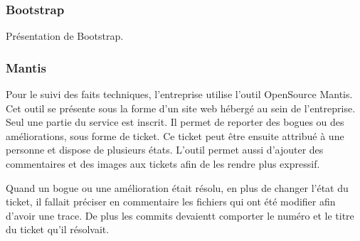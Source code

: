 \documentclass[12pt,a4paper]{article}
\begin{document}
\subsubsection{Bootstrap}
Présentation de Bootstrap.

\subsubsection{Mantis}
Pour le suivi des faits techniques, l'entreprise utilise l'outil OpenSource Mantis. Cet outil se présente sous la forme d'un site web hébergé au sein de l'entreprise. Seul une partie du service est inscrit. Il permet de reporter des bogues ou des améliorations, sous forme de ticket. Ce ticket peut être ensuite attribué à une personne et dispose de plusieurs états. L'outil permet aussi d'ajouter des commentaires et des images aux tickets afin de les rendre plus expressif.\par 
Quand un bogue ou une amélioration était résolu, en plus de changer l'état du ticket, il fallait préciser en commentaire les fichiers qui ont été modifier afin d'avoir une trace. De plus les commits devaientt comporter le numéro et le titre du ticket qu'il résolvait.\par

\newpage
\end{document}
